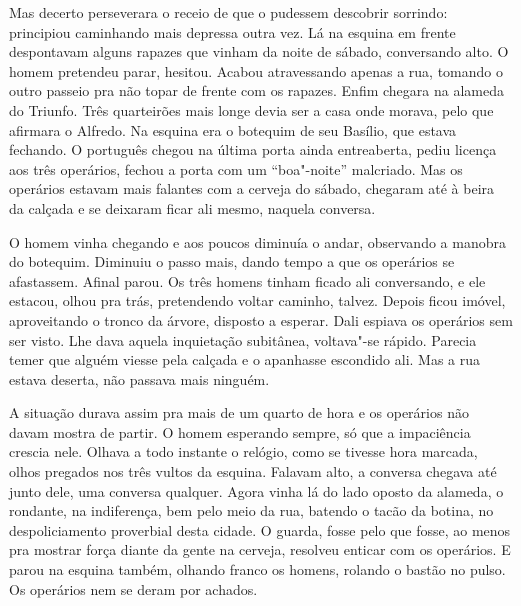 \begin{linenumbers}
Mas decerto perseverara o receio de que o pudessem descobrir sorrindo:
principiou caminhando mais depressa outra vez. Lá na esquina em frente
despontavam alguns rapazes que vinham da noite de sábado, conversando
alto. O homem pretendeu parar, hesitou. Acabou atravessando apenas a
rua, tomando o outro passeio pra não topar de frente com os rapazes.
Enfim chegara na alameda do Triunfo. Três quarteirões mais longe devia
ser a casa onde morava, pelo que afirmara o Alfredo. Na esquina era o
botequim de seu Basílio, que estava fechando. O português chegou na
última porta ainda entreaberta, pediu licença aos três operários, fechou
a porta com um ``boa"-noite'' malcriado. Mas os operários estavam mais
falantes com a cerveja do sábado, chegaram até à beira da calçada e se
deixaram ficar ali mesmo, naquela conversa.

O homem vinha chegando e aos poucos diminuía o andar, observando a
manobra do botequim. Diminuiu o passo mais, dando tempo a que os
operários se afastassem. Afinal parou. Os três homens tinham ficado ali
conversando, e ele estacou, olhou pra trás, pretendendo voltar caminho,
talvez. Depois ficou imóvel, aproveitando o tronco da árvore, disposto a
esperar. Dali espiava os operários sem ser visto. Lhe dava aquela
inquietação subitânea, voltava"-se rápido. Parecia temer que alguém
viesse pela calçada e o apanhasse escondido ali. Mas a rua estava
deserta, não passava mais ninguém.

A situação durava assim pra mais de um quarto de hora e os operários não
davam mostra de partir. O homem esperando sempre, só que a impaciência
crescia nele. Olhava a todo instante o relógio, como se tivesse hora
marcada, olhos pregados nos três vultos da esquina. Falavam alto, a
conversa chegava até junto dele, uma conversa qualquer. Agora vinha lá
do lado oposto da alameda, o rondante, na indiferença, bem pelo meio da
rua, batendo o tacão da botina, no despoliciamento proverbial desta
cidade. O guarda, fosse pelo que fosse, ao menos pra mostrar força
diante da gente na cerveja, resolveu enticar com os operários. E parou
na esquina também, olhando franco os homens, rolando o bastão no pulso.
Os operários nem se deram por achados.


\end{linenumbers}
